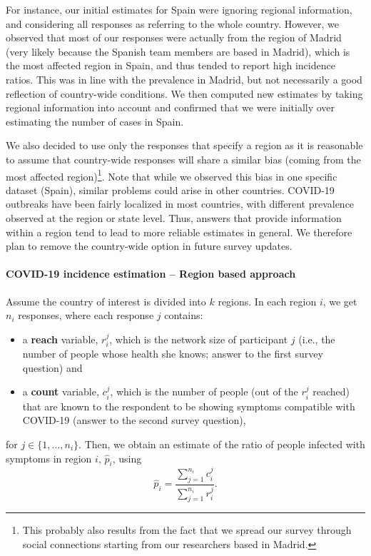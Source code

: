 \documentclass[sigconf]{acmart}
\newcommand{\af}[1]{{#1}}
\begin{document}
For instance, our initial estimates for Spain were ignoring regional information, and considering all responses as referring to the whole country. However, we observed that most of our responses were actually from the region of Madrid \af{(very likely because the Spanish team members are based in Madrid)}, which is the most affected region in Spain, and thus tended to report high incidence ratios. This was in line with the prevalence in Madrid, but not necessarily a good reflection of country-wide conditions. We then computed new estimates by taking regional information into account and confirmed that we were initially over estimating the number of cases in Spain. 

We also decided to use only the responses that specify a region as it is reasonable to assume that country-wide responses will share a similar bias (coming from the most affected region)\footnote{This probably also results from the fact that we spread our survey through social connections starting from our researchers based in Madrid.}. Note that while we observed this bias in one specific dataset (Spain), similar problems could arise in other countries. COVID-19 outbreaks have been fairly localized in most countries, with different prevalence observed at the region or state level. Thus, answers that provide information within a region tend to lead to more reliable estimates in general. We therefore plan to remove the country-wide option in future survey updates.

\paragraph{COVID-19 incidence estimation -- Region based approach}
Assume the country of interest is divided into $k$ regions. In each region $i$, we get $n_i$ responses, where each response $j$ contains:
\begin{itemize}
    \item a \textbf{reach} variable, $r_i^j$, which is the network size of participant $j$ (i.e., the number of people whose health she knows; answer to the first survey question) and
    \item a \textbf{count} variable, $c_i^j$, which is the number of people (out of the $r_i^j$ reached) that are known to the respondent to be showing symptoms compatible with COVID-19 (answer to the second survey question),
\end{itemize}
for $j \in \{1,\ldots,n_i\}$. Then, we obtain an estimate of the ratio of people infected with symptoms in region $i$, $\hat{p}_i$, using \cite{bernard2010counting}
$$
\hat{p}_i = \frac{\sum_{j = 1}^{n_i} c_i^j}{\sum_{j = 1}^{n_i} r_i^j}.
$$ 
\end{document}
